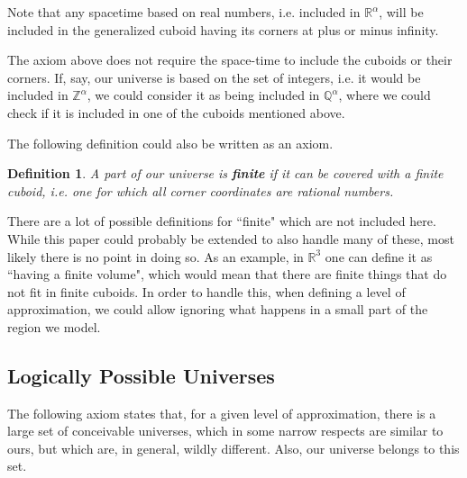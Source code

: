 \documentclass[a4paper
,draft
]{article}
\def\reale{\mathbb{R}}
\def\intregi{\mathbb{Z}}
\def\rationale{\mathbb{Q}}
\newcommand{\definitie}[1]{\textbf{#1}}
\newcommand{\ghilimele}[1]{``#1"}
\newtheorem{definition}{Definition}
\begin{document}
Note that any spacetime based on real numbers, i.e. included
in $\reale^\alpha$, will be included in the generalized cuboid having
its corners at plus or minus infinity.

The axiom above does not require the space-time to include the cuboids or
their corners.
If, say, our universe is based on the set of integers, i.e.
it would be included in $\intregi^\alpha$,
we could consider it as being included in $\rationale^\alpha$,
where we could check if it is included in one of the cuboids mentioned
above.

The following definition could also be written as an axiom.

\begin{definition}\label{finitecuboid}
  A part of our universe is \definitie{finite} if
  it can be covered with a finite cuboid, i.e. one
  for which all corner coordinates are rational numbers.
\end{definition}

There are a lot of possible definitions for \ghilimele{finite} which are not
included here.
While this paper could probably be extended to also handle many of these,
most likely there is no point in doing so.
As an example, in $\reale^3$ one can define it as
\ghilimele{having a finite volume}, which would
mean that there are finite things that do not fit in finite cuboids.
In order to handle this, when defining a level of approximation,
we could allow ignoring what happens in a small part of the region we model.

\subsection{Logically Possible Universes}

The following axiom states that, for a given level of approximation,
there is a large set of conceivable universes, which in some narrow respects
are similar to ours, but which are, in general, wildly different.
Also, our universe belongs to this set.
\end{document}
